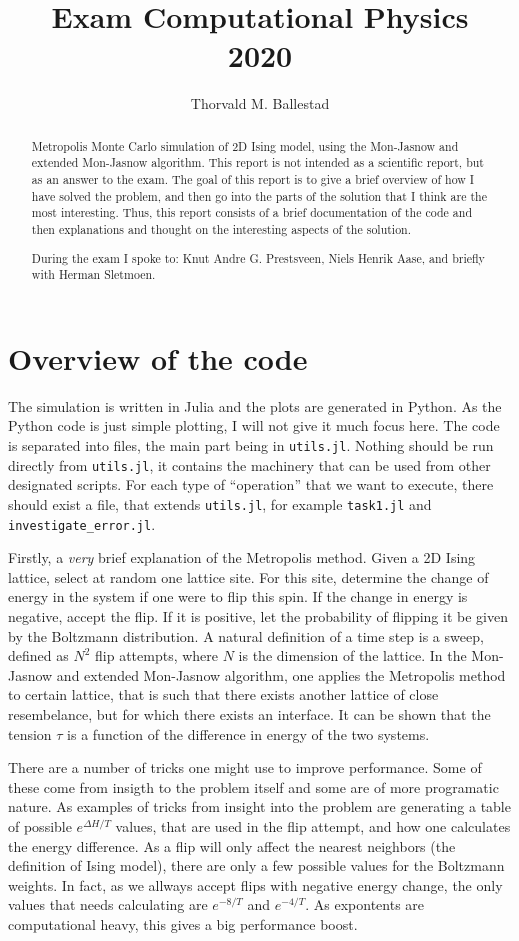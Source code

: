 \documentclass{article}
\title{Exam Computational Physics\\
  2020}
\author{Thorvald M. Ballestad}
\begin{document}
\maketitle
\begin{abstract}
  Metropolis Monte Carlo simulation of 2D Ising model, using the Mon-Jasnow and extended Mon-Jasnow algorithm.
  This report is not intended as a scientific report, but as an answer to the exam.
  The goal of this report is to give a brief overview of how I have solved the problem, and then go into the parts of the solution that I think are the most interesting.
  Thus, this report consists of a brief documentation of the code and then explanations and thought on the interesting aspects of the solution.


  During the exam I spoke to: Knut Andre G. Prestsveen, Niels Henrik Aase, and briefly with Herman Sletmoen.
\end{abstract}

\section{Overview of the code}
The simulation is written in Julia and the plots are generated in Python.
As the Python code is just simple plotting, I will not give it much focus here.
The code is separated into files, the main part being in \verb|utils.jl|.
Nothing should be run directly from \verb|utils.jl|, it contains the machinery that can be used from other designated scripts.
For each type of ``operation'' that we want to execute, there should exist a file, that extends \verb|utils.jl|, for example \verb|task1.jl| and \verb|investigate_error.jl|.

Firstly, a \emph{very} brief explanation of the Metropolis method.
Given a 2D Ising lattice, select at random one lattice site.
For this site, determine the change of energy in the system if one were to flip this spin.
If the change in energy is negative, accept the flip.
If it is positive, let the probability of flipping it be given by the Boltzmann distribution.
A natural definition of a time step is a sweep, defined as $N^2$ flip attempts, where $N$ is the dimension of the lattice.
In the Mon-Jasnow and extended Mon-Jasnow algorithm, one applies the Metropolis method to certain lattice, that is such that there exists another lattice of close resembelance, but for which there exists an interface.
It can be shown that the tension $\tau$ is a function of the difference in energy of the two systems.

There are a number of tricks one might use to improve performance.
Some of these come from insigth to the problem itself and some are of more programatic nature.
As examples of tricks from insight into the problem are generating a table of possible $e^{\Delta H/T}$ values, that are used in the flip attempt, and how one calculates the energy difference.
As a flip will only affect the nearest neighbors (the definition of Ising model), there are only a few possible values for the Boltzmann weights.
In fact, as we allways accept flips with negative energy change, the only values that needs calculating are $e^{-8/T}$ and $e^{-4/T}$.
As expontents are computational heavy, this gives a big performance boost.
\end{document}
